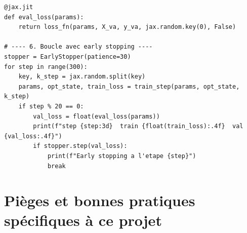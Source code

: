 \documentclass[11pt,a4paper]{article}
\begin{document}
\begin{lstlisting}
@jax.jit
def eval_loss(params):
    return loss_fn(params, X_va, y_va, jax.random.key(0), False)

# ---- 6. Boucle avec early stopping ----
stopper = EarlyStopper(patience=30)
for step in range(300):
    key, k_step = jax.random.split(key)
    params, opt_state, train_loss = train_step(params, opt_state, k_step)
    if step % 20 == 0:
        val_loss = float(eval_loss(params))
        print(f"step {step:3d}  train {float(train_loss):.4f}  val {val_loss:.4f}")
        if stopper.step(val_loss):
            print(f"Early stopping a l'etape {step}")
            break
\end{lstlisting}

\section{Pièges et bonnes pratiques spécifiques à ce projet}
\end{document}

